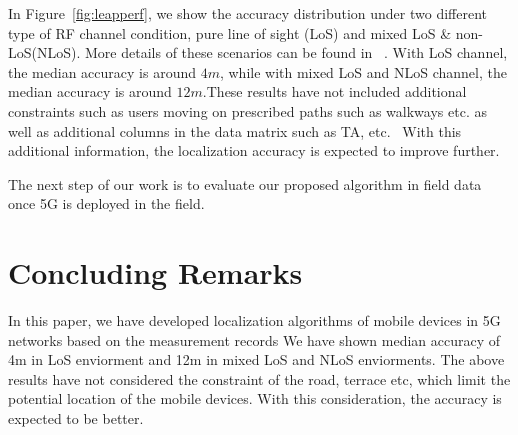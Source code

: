 \documentclass[conference, 10pt]{IEEEtran}
\begin{document}
In Figure~\ref{fig:leapperf}, we show the
accuracy distribution under two different type of RF channel condition, pure line of sight (LoS) and mixed LoS \& non-LoS(NLoS). More details of these scenarios can be found in 
~\cite{3gpp38901}. With LoS channel, the median accuracy is around
$4m$, while with mixed LoS and NLoS channel, the median accuracy is around $12m$.These results have not included additional constraints such as users moving on prescribed paths such as walkways etc. as well as additional columns in the data matrix such as TA, etc. 
With this additional information, the localization accuracy is expected to improve further. 

The next step of our work is to evaluate our proposed algorithm in field data once 5G is deployed in the field. 

\section{Concluding Remarks}
\label{sec:concl}

In this paper, we have developed localization algorithms of mobile devices in 5G networks based on the measurement records 
We have shown median accuracy of 4m in LoS enviorment and 12m in mixed LoS and NLoS enviorments. 
The above results have not considered the constraint of the road, terrace etc, which limit the potential location of the mobile devices. With this consideration,
the accuracy is expected to be better.  




%
%    

{%


}
\end{document}
